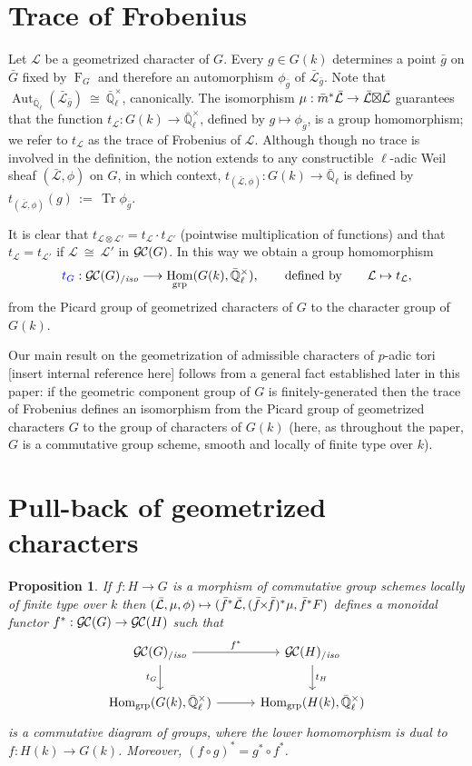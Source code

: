 \documentclass[11pt]{amsart}
\theoremstyle{plain}
\newtheorem{proposition}[theorem]{Proposition}
\theoremstyle{definition}
\theoremstyle{remark}
\newcommand{\EE}{\mathbb{\bar Q}_\ell}
\newcommand{\Fq}{k}
\newcommand{\EEx}{\EE^\times}
\newcommand{\Frob}[1]{{\operatorname{F}_{#1}}}
\DeclareMathOperator{\Aut}{Aut}
\DeclareMathOperator{\Hom}{Hom}
\DeclareMathOperator{\trace}{Tr}
\newcommand{\cdef}[1]{{{\color{blue}#1}\index{#1}}}
\newcommand{\ceq}{{\, :=\, }}
\newcommand{\iso}{{\ \cong\ }}
\newcommand{\cs}[1]{{\mathcal{#1}}}
\newcommand{\gcs}[1]{{\mathcal{\bar #1}}}
\newcommand{\GC}{{\mathcal{G\hskip-0.8pt C}}}
\newcommand{\GCiso}[1]{\GC(#1)_{/\textit{iso}}}
\newcommand{\trFrob}[1]{t_{#1}}
\renewcommand{\bf}{\bar{f}}
\newcommand{\bg}{\bar{g}}
\newcommand{\bm}{\bar{m}}
\newcommand{\bG}{\bar{G}}
\newcommand{\tight}[3]{\hspace{-#1pt}{#2}\hspace{-#3pt}}
\newcommand{\bfxf}{\text{$\bar{f} \tight{1}{\times}{1} \bar{f}$}}
\newcommand{\LxL}{\text{$\gcs{L} \tight{0}{\boxtimes}{0} \gcs{L}$}}
\begin{document}
\section{Trace of Frobenius}\label{sec:Frob}

Let $\cs{L}$ be a geometrized character of $G$. Every $g\in G(\Fq)$
determines a point $\bg$ on $\bG$ fixed by $\Frob{G}$ and
therefore an automorphism $\phi_{\bg}$ of $\gcs{L}_{\bg}$. Note
that $\Aut_{\EE}(\gcs{L}_{\bg}) \iso \EEx$, canonically. The isomorphism $\mu : \bm^* \gcs{L} \to \LxL$
guarantees that the function $\trFrob{\cs{L}} : G(\Fq)\to \EEx$,
defined by $g \mapsto \phi_{\bg}$, is a group homomorphism;
we refer to $\trFrob{\cs{L}}$ as the \cdef{trace of Frobenius of $\cs{L}$}.
Although though no trace is involved in the definition, the notion extends 
to any constructible $\ell$-adic Weil sheaf $(\gcs{L},\phi)$ on $G$, in which context,
$\trFrob{(\gcs{L},\phi)} : G(\Fq)\to \EE$ is defined by $\trFrob{(\gcs{L},\phi)}(g) \ceq \trace \phi_{\bg}$.

It is clear that $\trFrob{\cs{L}\otimes \cs{L'}} = \trFrob{\cs{L}} \cdot \trFrob{\cs{L'}}$
(pointwise multiplication of functions) and that $\trFrob{\cs{L}} = \trFrob{\cs{L'}}$
if $\cs{L} \iso \cs{L'}$ in $\GC(G)$. In this way we obtain a group homomorphism
\[
\cdef{\trFrob{G}} : \GCiso{G} \longrightarrow \Hom_\text{grp}(G(\Fq),\EEx),
\qquad \text{defined by}\qquad \cs{L} \mapsto \trFrob{\cs{L}},
\]
from the Picard group of geometrized characters of $G$ to the character group of $G(\Fq)$.

Our main result on the geometrization of admissible characters of
$p$-adic tori [insert internal reference here] follows from a general
fact established later in this paper: if the geometric component group
of $G$ is finitely-generated then the trace of Frobenius defines an
isomorphism from the Picard group of geometrized characters $G$ to the
group of characters of $G(\Fq)$ (here, as throughout the paper, $G$ is
a commutative group scheme, smooth and locally of finite type over $\Fq$).

\section{Pull-back of geometrized characters}\label{subsection:pullback}

\begin{proposition}\label{prop:pullback}
  If $f : H\to G$ is a morphism of commutative group schemes locally of finite type over $\Fq$ then
  $(\gcs{L},\mu,\phi) \mapsto (\bf^*\gcs{L},(\bfxf)^*\mu,\bf^*F)$
  defines a monoidal functor $f^* : \GC(G) \to \GC(H)$ such that
  \[
  \begin{tikzcd}[row sep=20, column sep=30]
   \GCiso{G} \rar{f^*} \arrow[swap]{d}{\trFrob{G}} & \GCiso{H} \dar{t_H} \\
  \Hom_\text{grp}(G(\Fq),\EEx) \rar & \Hom_\text{grp}(H(\Fq),\EEx)
  \end{tikzcd}
  \]
  is a commutative diagram of groups, where the lower homomorphism is
  dual to $f : H(\Fq)\to G(\Fq)$.  Moreover, $(f\circ g)^* = g^* \circ f^*$.
\end{proposition}
\end{document}
